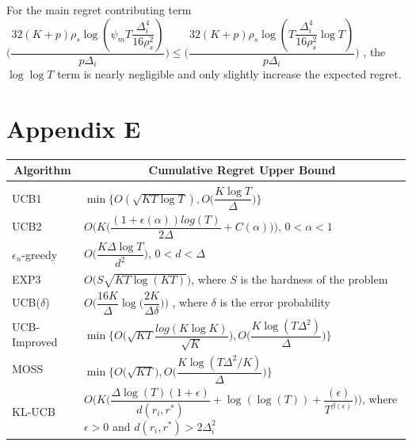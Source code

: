 	For the main regret contributing term $\bigg(\dfrac{32(K+p)\rho_{s}\log{(\psi_{m}T\dfrac{\Delta_{i}^{4}}{16\rho_{s}^{2}})}}{p\Delta_{i}}\bigg) \leq \bigg(\dfrac{32(K+p)\rho_{s}\log{(T\dfrac{\Delta_{i}^{4}}{16\rho_{s}^{2}}\log T)}}{p\Delta_{i}}\bigg)$ , the $\log \log T$ term is nearly negligible and only slightly increase the expected regret.


\section{Appendix E}
\label{sample-table}
\begin{center}
\begin{tabular}{ll}
\multicolumn{1}{c}{\bf Algorithm}  &\multicolumn{1}{c}{\bf Cumulative Regret Upper Bound} \\
\hline \\
UCB1         &\hspace*{5em}$\min\bigg\lbrace O(\sqrt{KT\log T}) ,O\bigg(\dfrac{K\log T}{\Delta}\bigg)\bigg\rbrace$ \\
UCB2         &\hspace*{5em}$O\bigg(K\bigg(\dfrac{(1 + \epsilon(\alpha)) log(T)}{2\Delta} + C(\alpha)\bigg)\bigg)$, $0<\alpha<1$ \\
$\epsilon_{n}$-greedy         &\hspace*{5em}$O\bigg(\dfrac{K\Delta\log T}{d^{2}}\bigg)$, $0<d<\Delta$ \\
EXP3             &\hspace*{5em}$O\bigg(S \sqrt{KT \log(KT)}\bigg)$, where $S$ is the hardness of the problem \\
UCB($\delta$)	&\hspace*{5em}$O\bigg(\dfrac{16K}{\Delta}\log\big(\dfrac{2K}{\Delta\delta}\big)\bigg)$ , where $\delta$ is the error probability\\
UCB-Improved             &\hspace*{5em}$\min\bigg\lbrace O\bigg(\sqrt{KT}\dfrac{log(K\log K)}{\sqrt{K}}\bigg), O\bigg(\dfrac{K\log (T\Delta^{2})}{\Delta}\bigg)\bigg\rbrace$ \\
MOSS				&\hspace*{5em}$\min\bigg\lbrace O\bigg(\sqrt{KT}\bigg), O\bigg(\dfrac{K\log(T\Delta^{2}/K)}{\Delta}\bigg) \bigg \rbrace$\\
KL-UCB         &\hspace*{5em}$O\bigg(K\bigg(\dfrac{\Delta \log(T)(1 + \epsilon)}{d(r_{i}, r^{*} )} + \log(\log(T)) + \dfrac{(\epsilon)}{T^{\beta(\epsilon)}}\bigg)\bigg)$, where $\epsilon > 0$ and $d(r_{i}, r^{*})>2\Delta_{i}^{2}$\\

\end{tabular}
\end{center}
